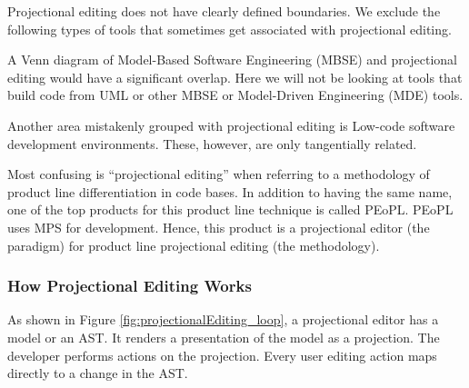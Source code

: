 Projectional editing does not have clearly defined boundaries.
We exclude the following types of tools that sometimes get associated with projectional editing.

A Venn diagram of Model-Based Software Engineering (MBSE) and projectional editing would have a significant overlap.
Here we will not be looking at tools that build code from UML or other MBSE or Model-Driven Engineering (MDE) tools.

Another area mistakenly grouped with projectional editing is Low-code software development environments.
These, however, are only tangentially related.

Most confusing is ``projectional editing'' when referring to a methodology of product line differentiation in code bases.
In addition to having the same name, one of the top products for this product line technique is called PEoPL.
PEoPL uses MPS for development.
Hence, this product is a projectional editor (the paradigm) for product line projectional editing (the methodology).

\subsubsection{How Projectional Editing Works}

As shown in Figure \ref{fig:projectionalEditing_loop}, a projectional editor has a model or an AST.
It renders a presentation of the model as a projection.
The developer performs actions on the projection.
Every user editing action maps directly to a change in the AST.

